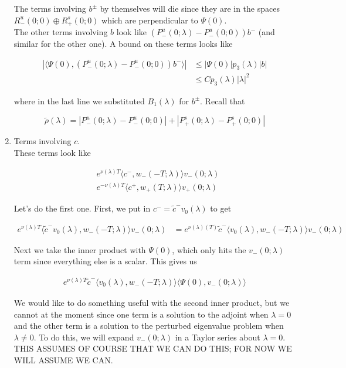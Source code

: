 \documentclass[12pt]{article}
\begin{document}
\begin{enumerate}
The terms involving $b^\pm$ by themselves will die since they are in the spaces $R^u_-(0; 0) \oplus R^s_+(0; 0)$ which are perpendicular to $\Psi(0)$.\\

The other terms involving $b$ look like $(P^u_-(0; \lambda) - P^u_-(0; 0))b^-$ (and similar for the other one). A bound on these terms looks like

\begin{align*}
|\langle \Psi(0), (P^u_-(0; \lambda) - P^u_-(0; 0))b^- \rangle|
&\leq |\Psi(0)| p_3(\lambda)|b| \\
&\leq C p_3(\lambda) |\lambda|^2
\end{align*}

where in the last line we substituted $B_1(\lambda)$ for $b^\pm$. Recall that

\[
\tilde{\rho}(\lambda) = |P^u_-(0;\lambda) - P^u_-(0; 0)| + |P^s_+(0;\lambda) - P^s_+(0;0)|
\]

\item Terms involving $c$.\\

These terms look like

\begin{align*}
&e^{\nu(\lambda)T}  \langle c^-, w_-(-T; \lambda) \rangle v_-(0; \lambda) \\
&e^{-\nu(\lambda)T} \langle c^+, w_+(T; \lambda) \rangle v_+(0; \lambda) 
\end{align*}

Let's do the first one. First, we put in $c^- = \tilde{c}^- v_0(\lambda)$ to get

\begin{align*}
e^{\nu(\lambda)T} \langle \tilde{c}^- v_0(\lambda), w_-(-T; \lambda) \rangle v_-(0; \lambda) &= e^{\nu(\lambda)(T)} \tilde{c}^- \langle v_0(\lambda), w_-(-T; \lambda) \rangle v_-(0; \lambda)
\end{align*}

Next we take the inner product with $\Psi(0)$, which only hits the $v_-(0; \lambda)$ term since everything else is a scalar. This gives us 

\begin{align*}
e^{\nu(\lambda)T} \tilde{c}^- \langle v_0(\lambda), w_-(-T; \lambda) \rangle \langle \Psi(0), v_-(0; \lambda) \rangle
\end{align*}

We would like to do something useful with the second inner product, but we cannot at the moment since one term is a solution to the adjoint when $\lambda = 0$ and the other term is a solution to the perturbed eigenvalue problem when $\lambda \neq 0$. To do this, we will expand $v_-(0; \lambda)$ in a Taylor series about $\lambda = 0$. THIS ASSUMES OF COURSE THAT WE CAN DO THIS; FOR NOW WE WILL ASSUME WE CAN.


\end{enumerate}
\end{document}
